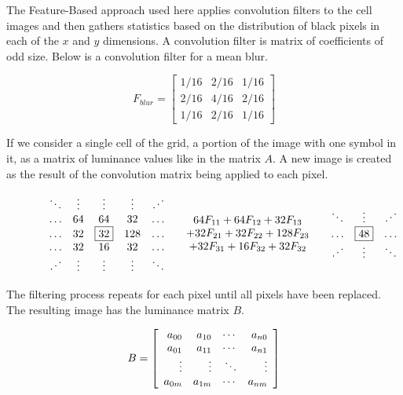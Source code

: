 The Feature-Based approach used here applies convolution filters to the
cell images and then gathers statistics based on the distribution of black
pixels in each of the $x$ and $y$ dimensions. A convolution filter is matrix
of coefficients of odd size. Below is a convolution filter for a mean blur.

\[ F_{blur} = \left[
\begin{array}{ccc}
1/16 & 2/16 & 1/16 \\
2/16 & 4/16 & 2/16 \\
1/16 & 2/16 & 1/16
\end{array}\right] \]

If we consider a single cell of the grid, a portion of the image with one symbol in it,
as a matrix of luminance values like in the matrix $A$. A new image is created as the
result of the convolution matrix being applied to each pixel.

\begin{figure}[h] \[
\begin{array}{lcr}
\begin{array}{ccccc}
\ddots & \vdots & \vdots & \vdots & \iddots \\
\ldots & 64 & 64 & 32 & \ldots \\
\ldots & 32 & \fbox{32} & 128 & \ldots \\
\ldots & 32 & 16 & 32 & \ldots \\
\iddots & \vdots & \vdots & \vdots & \ddots \\
\end{array} &
\begin{array}{c}
64F_{11} + 64F_{12} + 32F_{13} \\
+ 32F_{21} + 32F_{22} + 128F_{23} \\
+ 32F_{31} + 16F_{32} + 32F_{32} \\
\end{array} &
\begin{array}{ccccc}
\ddots & \vdots & \iddots \\
\ldots &  \fbox{48}  & \ldots \\
\iddots & \vdots & \ddots \\
\end{array}
\end{array} \]
\end{figure}

The filtering process repeats for each pixel until all pixels have been replaced.
The resulting image has the luminance matrix $B$.

\[B = \left [
    \begin{array}{r r r r}
        a_{00} & a_{10} & \cdots & a_{n0} \\
        a_{01} & a_{11} & \cdots & a_{n1}\\
        \vdots  & \vdots  & \ddots & \vdots\\
        a_{0m} & a_{1m} & \cdots & a_{nm}\\
    \end{array}
\right ] \]

